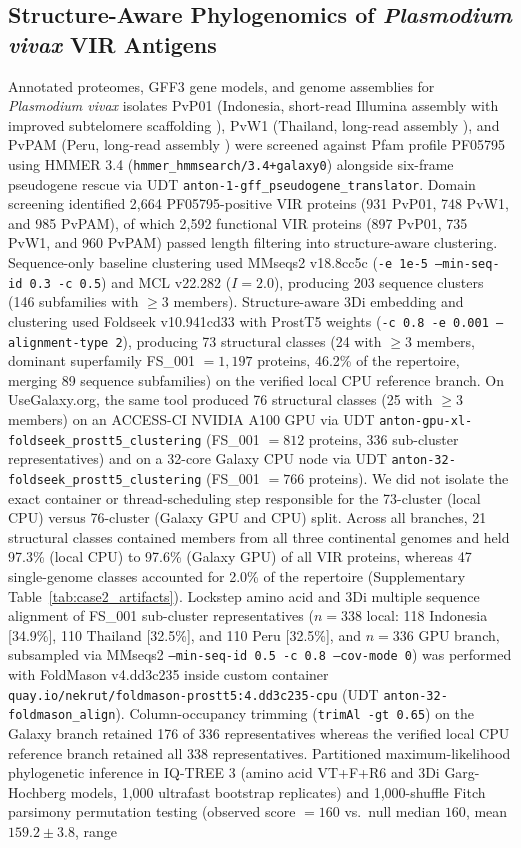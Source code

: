 \documentclass[11pt,letterpaper]{article}
\begin{document}
\subsection*{Structure-Aware Phylogenomics of \textit{Plasmodium vivax} VIR Antigens}
Annotated proteomes, GFF3 gene models, and genome assemblies for \textit{Plasmodium vivax} isolates PvP01 (Indonesia, short-read Illumina assembly with improved subtelomere scaffolding \cite{auburn2016}), PvW1 (Thailand, long-read assembly \cite{minassian2021pvw1}), and PvPAM (Peru, long-read assembly \cite{demeulenaere2023}) were screened against Pfam profile PF05795 using HMMER 3.4 (\texttt{hmmer\_hmmsearch/3.4+galaxy0}) alongside six-frame pseudogene rescue via UDT \texttt{anton-1-gff\_pseudogene\_translator}. Domain screening identified 2,664 PF05795-positive VIR proteins (931 PvP01, 748 PvW1, and 985 PvPAM), of which 2,592 functional VIR proteins (897 PvP01, 735 PvW1, and 960 PvPAM) passed length filtering into structure-aware clustering. Sequence-only baseline clustering used MMseqs2 v18.8cc5c (\texttt{-e 1e-5 --min-seq-id 0.3 -c 0.5}) and MCL v22.282 ($I = 2.0$), producing 203 sequence clusters (146 subfamilies with $\ge 3$ members). Structure-aware 3Di embedding and clustering used Foldseek v10.941cd33 with ProstT5 weights (\texttt{-c 0.8 -e 0.001 --alignment-type 2}), producing 73 structural classes (24 with $\ge 3$ members, dominant superfamily FS\_001 $= 1,197$ proteins, 46.2\% of the repertoire, merging 89 sequence subfamilies) on the verified local CPU reference branch. On UseGalaxy.org, the same tool produced 76 structural classes (25 with $\ge 3$ members) on an ACCESS-CI NVIDIA A100 GPU via UDT \texttt{anton-gpu-xl-foldseek\_prostt5\_clustering} (FS\_001 $= 812$ proteins, 336 sub-cluster representatives) and on a 32-core Galaxy CPU node via UDT \texttt{anton-32-foldseek\_prostt5\_clustering} (FS\_001 $= 766$ proteins). We did not isolate the exact container or thread-scheduling step responsible for the 73-cluster (local CPU) versus 76-cluster (Galaxy GPU and CPU) split. Across all branches, 21 structural classes contained members from all three continental genomes and held 97.3\% (local CPU) to 97.6\% (Galaxy GPU) of all VIR proteins, whereas 47 single-genome classes accounted for 2.0\% of the repertoire (Supplementary Table~\ref{tab:case2_artifacts}). Lockstep amino acid and 3Di multiple sequence alignment of FS\_001 sub-cluster representatives ($n = 338$ local: 118 Indonesia [34.9\%], 110 Thailand [32.5\%], and 110 Peru [32.5\%], and $n = 336$ GPU branch, subsampled via MMseqs2 \texttt{--min-seq-id 0.5 -c 0.8 --cov-mode 0}) was performed with FoldMason v4.dd3c235 inside custom container \nolinkurl{quay.io/nekrut/foldmason-prostt5:4.dd3c235-cpu} (UDT \texttt{anton-32-foldmason\_align}). Column-occupancy trimming (\texttt{trimAl -gt 0.65}) on the Galaxy branch retained 176 of 336 representatives whereas the verified local CPU reference branch retained all 338 representatives. Partitioned maximum-likelihood phylogenetic inference in IQ-TREE 3 (amino acid VT+F+R6 and 3Di Garg-Hochberg models, 1,000 ultrafast bootstrap replicates) and 1,000-shuffle Fitch parsimony permutation testing (observed score $= 160$ vs.\ null median $160$, mean $159.2 \pm 3.8$, range 
\end{document}
